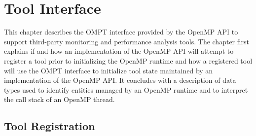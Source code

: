 %
%
%
%
%
%
%
%
%
%


\chapter{Tool Interface}
\label{chap:ToolsSupport}

This chapter describes the OMPT interface provided by the OpenMP API
to support third-party monitoring and performance analysis tools.
The chapter first explains if and how an implementation of
the OpenMP API will attempt to register a tool prior to initializing the OpenMP runtime and
how a registered tool will use the OMPT interface to initialize tool state maintained by
an implementation of the OpenMP API.
It concludes with a description of data types
used to identify entities managed by an OpenMP runtime and to interpret the
call stack of an OpenMP thread.

\section{Tool Registration}
\label{sec:ToolsSupport_Registration}

